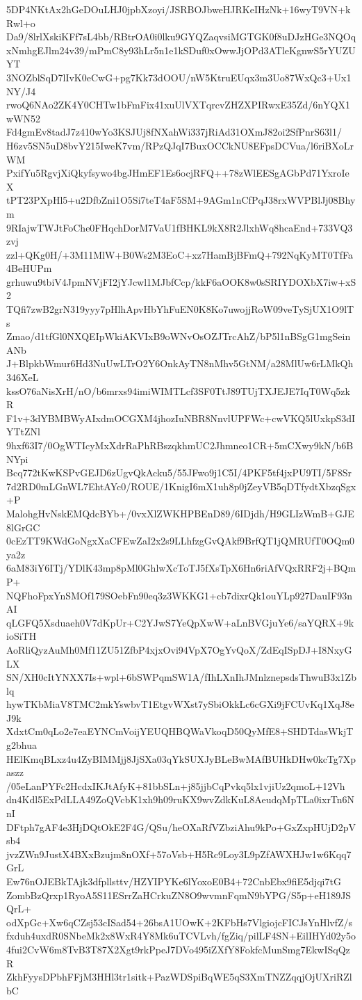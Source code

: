 5DP4NKtAx2hGeDOuLHJ0jpbXzoyi/JSRBOJbweHJRKeIHzNk+16wyT9VN+kRwl+o
Da9/8lrlXskiKFf7sL4bb/RBtrOA0i0lku9GYQZaqvsiMGTGK0f8uDJzHGe3NQOq
xNmhgEJlm24v39/mPmC8y93hLr5n1e1kSDuf0xOwwJjOPd3ATleKgnwS5rYUZUYT
3NOZblSqD7lIvK0eCwG+pg7Kk73dOOU/nW5KtruEUqx3m3Uo87WxQc3+Ux1NY/J4
rwoQ6NAo2ZK4Y0CHTw1bFmFix41xuUlVXTqrcvZHZXPIRwxE35Zd/6nYQX1wWN52
Fd4gmEv8tadJ7z410wYo3KSJUj8fNXahWi337jRiAd31OXmJ82oi2SfPnrS63l1/
H6zv5SN5uD8bvY215IweK7vm/RPzQJqI7BuxOCCkNU8EFpsDCVua/l6riBXoLrWM
PxifYu5RgvjXiQkyfsywo4bgJHmEF1Es6ocjRFQ++78zWlEESgAGbPd71YxroIeX
tPT23PXpHl5+u2DfbZni1O5Si7teT4aF5SM+9AGm1nCfPqJ38rxWVPBlJj08Bhym
9RIajwTWJtFoChe0FHqchDorM7VaU1fBHKL9kX8R2JlxhWq8hcaEnd+733VQ3zvj
zzl+QKg0H/+3M11MlW+B0Ws2M3EoC+xz7HamBjBFmQ+792NqKyMT0TfFa4BeHUPm
grhuwu9tbiV4JpmNVjFI2jYJcwl1MJbfCcp/kkF6aOOK8w0sSRIYDOXbX7iw+xS2
TQfi7zwB2grN319yyy7pHlhApvHbYhFuEN0K8Ko7uwojjRoW09veTySjUX1O9lTs
Zmao/d1tfGl0NXQEIpWkiAKVIxB9oWNvOsOZJTrcAhZ/bP5l1nBSgG1mgSeinANb
J+BlpkbWmur6Hd3NuUwLTrO2Y6OnkAyTN8nMhv5GtNM/a28MlUw6rLMkQh346XeL
kssO76aNisXrH/nO/b6mrxs94imiWIMTLcf3SF0TtJ89TUjTXJEJE7IqT0Wq5zkR
F1v+3dYBMBWyAIxdmOCGXM4jhozIuNBR8NnvlUPFWc+cwVKQ5lUxkpS3dIYTtZNl
9hxf63I7/0OgWTIcyMxXdrRaPhRBszqkhmUC2Jhmneo1CR+5mCXwy9kN/b6BNYpi
Bcq772tKwKSPvGEJD6zUgvQkAcku5/55JFwo9j1C5I/4PKF5tf4jxPU9TI/5F8Sr
7d2RD0mLGnWL7EhtAYc0/ROUE/1KnigI6mX1uh8p0jZeyVB5qDTfydtXbzqSgx+P
MalohgHvNskEMQdcBYb+/0vxXlZWKHPBEnD89/6IDjdh/H9GLIzWmB+GJE8lGrGC
0cEzTT9KWdGoNgxXaCFEwZaI2x2s9LLhfzgGvQAkf9BrfQT1jQMRUfT0OQm0ya2z
6aM83iY6ITj/YDlK43mp8pMl0GhlwXcToTJ5fXsTpX6Hn6riAfVQxRRF2j+BQmP+
NQFhoFpxYnSMOf179SOebFn90eq3z3WKKG1+cb7dixrQk1ouYLp927DauIF93nAI
qLGFQ5Xsduaeh0V7dKpUr+C2YJwS7YeQpXwW+aLnBVGjuYe6/saYQRX+9kioSiTH
AoRliQyzAuMh0Mf11ZU51ZfbP4xjxOvi94VpX7OgYvQoX/ZdEqISpDJ+I8NxyGLX
SN/XH0cItYNXX7Is+wpl+6bSWPqmSW1A/fIhLXnIhJMnlznepsdsThwuB3x1Zblq
hywTKbMiaV8TMC2mkYswbvT1EtgvWXst7ySbiOkkLc6cGXi9jFCUvKq1XqJ8eJ9k
XdxtCm0qLo2e7eaEYNCmVoijYEUQHBQWaVkoqD50QyMfE8+SHDTdasWkjTg2bhua
HElKmqBLxz4u4ZyBIMMjj8JjSXa03qYkSUXJyBLeBwMAfBUHkDHw0kcTg7Xpaszz
/05eLanPYFc2HcdxIKJtAfyK+81bbSLn+j85jjbCqPvkq5lx1vjiUz2qmoL+12Vh
dn4Kdl5ExPdLLA49ZoQVcbK1xh9h09ruKX9wvZdkKuL8AeudqMpTLa0ixrTn6NnI
DFtph7gAF4e3HjDQtOkE2F4G/QSu/heOXaRfVZbziAhu9kPo+GxZxpHUjD2pVsb4
jvzZWn9JustX4BXxBzujm8nOXf+57oVsb+H5Rc9Loy3L9pZfAWXHJw1w6Kqq7GrL
Ew76nOJEBkTAjk3dfpllsttv/HZYIPYKe6lYoxoE0B4+72CnbEbx9fiE5djqi7tG
ZombBzQrxp1RyoA5S11ESrrZaHCrkuZN8O9wvmnFqmN9bYPG/S5p+eH189JSQrL+
odXpGc+Xw6qCZsj53cISad54+26bsA1UOwK+2KFbHs7VlgiojcFICJsYnHlvfZ/s
fxduh4uxdR0SNbeMk2x8WxR4Y8Mk6uTCVLvh/fgZiq/pilLF4SN+EilIHYd02y5o
4fui2CvW6m8TvB3T87X2Xgt9rkPpeJ7DVo495iZXfY8FokfcMunSmg7EkwISqQzR
ZkhFyysDPbhFFjM3HHl3tr1sitk+PazWDSpiBqWE5qS3XmTNZZqqjOjUXriRZlbC
